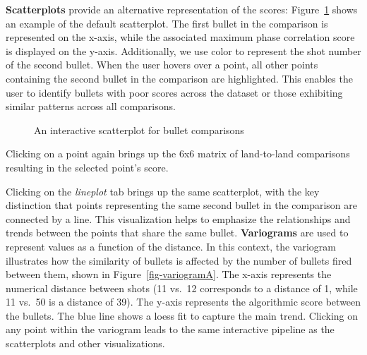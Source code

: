 \documentclass[
  12pt]{article}
\begin{document}
\textbf{Scatterplots} provide an alternative representation of the
scores: Figure~\ref{fig-scatterplot} shows an example of the default
scatterplot. The first bullet in the comparison is represented on the
x-axis, while the associated maximum phase correlation score is
displayed on the y-axis. Additionally, we use color to represent the
shot number of the second bullet. When the user hovers over a point, all
other points containing the second bullet in the comparison are
highlighted. This enables the user to identify bullets with poor scores
across the dataset or those exhibiting similar patterns across all
comparisons.

\begin{figure}


\caption{\label{fig-scatterplot}An interactive scatterplot for bullet
comparisons}

\end{figure}%

Clicking on a point again brings up the 6x6 matrix of land-to-land
comparisons resulting in the selected point's score.

Clicking on the \emph{lineplot} tab brings up the same scatterplot, with
the key distinction that points representing the same second bullet in
the comparison are connected by a line. This visualization helps to
emphasize the relationships and trends between the points that share the
same bullet. \hfill\newline \textbf{Variograms} are used to represent
values as a function of the distance. In this context, the variogram
illustrates how the similarity of bullets is affected by the number of
bullets fired between them, shown in Figure~\ref{fig-variogramA}. The
x-axis represents the numerical distance between shots (11 vs.~12
corresponds to a distance of 1, while 11 vs.~50 is a distance of 39).
The y-axis represents the algorithmic score between the bullets. The
blue line shows a loess fit to capture the main trend. Clicking on any
point within the variogram leads to the same interactive pipeline as the
scatterplots and other visualizations.
\end{document}

